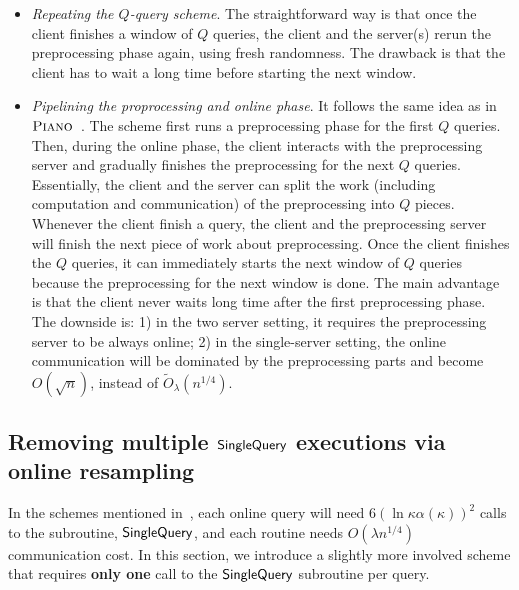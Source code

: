 \begin{itemize}
    \item \textit{Repeating the $Q$-query scheme}. 
    The straightforward way is that once the client finishes a window of $Q$ queries, the client and the server(s) rerun the preprocessing phase again, using fresh randomness. 
    The drawback is that the client has to wait a long time before starting the next window.
    
    \item \textit{Pipelining the proprocessing and online phase}.
    It follows the same idea as in $\textsc{Piano}$~\cite{piano}.
    The scheme first runs a preprocessing phase for the first $Q$ queries. 
    Then, during the online phase, the client interacts with the preprocessing server and gradually finishes the preprocessing for the next $Q$ queries. 
    Essentially, the client and the server can split the work (including computation and communication) of the preprocessing into $Q$ pieces.
    Whenever the client finish a query, the client and the preprocessing server will finish the next piece of work about preprocessing.
    Once the client finishes the $Q$ queries, it can immediately starts the next window of $Q$ queries because the preprocessing for the next window is done. 
    The main advantage is that the client never waits long time after the first preprocessing phase.
    The downside is: 1) in the two server setting, it requires the preprocessing server to be always online; 2) in the single-server setting, the online communication will be dominated by the preprocessing parts and become $O(\sqrt{n})$, instead of $\widetilde{O}_\lambda(n^{1/4})$.
\end{itemize} 









\subsection{Removing multiple $\mathsf{SingleQuery}$ executions via online resampling}



In the schemes mentioned in~, each online query will need
$6(\ln \kappa \alpha(\kappa))^2$ calls to the subroutine, $\mathsf{SingleQuery}$, and
each routine needs $O(\lambda n^{1/4})$ communication cost. In this section, we
introduce a slightly more involved scheme that requires \textbf{only one} call
to the $\mathsf{SingleQuery}$ subroutine per query.

